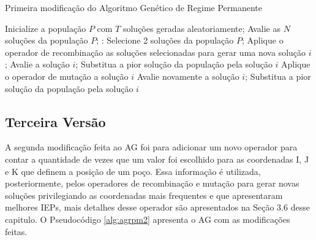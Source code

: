 \begin{algorithm}[H]
  \caption{Primeira modificação do Algoritmo Genético de Regime Permanente}
  \label{alg:agrpm}
  \begin{algorithmic}
    \State Inicialize a população $P$ com $T$ soluções geradas aleatoriamente;
    \State Avalie as $N$ soluções da população $P$;
       \State:
        \State Selecione 2 soluções da população $P$;
        \State Aplique o operador de recombinação as soluções selecionadas para gerar uma nova solução $i$;
        \State Avalie a solução $i$;
          \State Substitua a pior solução da população pela solução $i$	
        \Else
          \State Aplique o operador de mutação a solução $i$	
          \State Avalie novamente a solução $i$;
            \State Substitua a pior solução da população pela solução $i$
          \EndIf
        \EndIf
      \EndFor
    \EndWhile
  \end{algorithmic}
\end{algorithm}

\subsection{Terceira Versão}

A segunda modificação feita ao AG foi para adicionar um novo operador para contar a quantidade de vezes que um valor foi escolhido para as coordenadas I, J e K que definem a posição de um poço. Essa informação é utilizada, posteriormente, pelos operadores de recombinação e mutação para gerar novas soluções privilegiando as coordenadas mais frequentes e que apresentaram melhores IEPs, mais detalhes desse operador são apresentados na Seção 3.6 desse capitulo. O Pseudocódigo \ref{alg:agrpm2} apresenta o AG com as modificações feitas.


